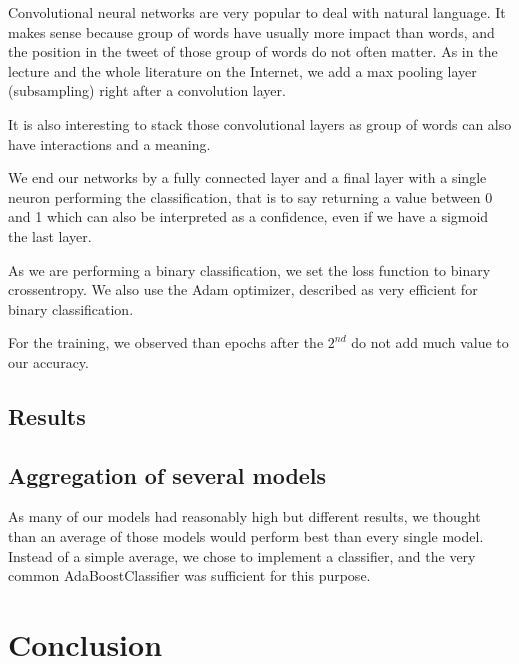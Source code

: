 \documentclass[10pt,conference,compsocconf]{IEEEtran}
\begin{document}
Convolutional neural networks are very popular to deal with natural language. It makes sense because group of words have usually more impact than words, and the position in the tweet of those group of words do not often matter.
As in the lecture and the whole literature on the Internet, we add a max pooling layer (subsampling) right after a convolution layer.

It is also interesting to stack those convolutional layers as group of words can also have interactions and a meaning.

We end our networks by a fully connected layer and a final layer with a single neuron performing the classification, that is to say returning a value between 0 and 1 which can also be interpreted as a confidence, even if we have a sigmoid the last layer.

As we are performing a binary classification, we set the loss function to binary crossentropy. We also use the Adam optimizer, described as very efficient for binary classification.

For the training, we observed than epochs after the $2^{nd}$ do not add much value to our accuracy.

\subsection{Results}

\subsection{Aggregation of several models}

As many of our models had reasonably high but different results, we thought than an average of those models would perform best than every single model. Instead of a simple average, we chose to implement a classifier, and the very common AdaBoostClassifier was sufficient for this purpose.

\section{Conclusion}
\end{document}
